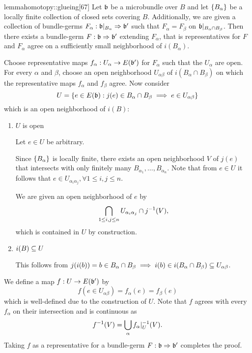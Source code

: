 
\begin{mystatement}{lemma}{homotopy::glueing}[67]
    Let $\bb$ be a microbundle over $B$ and let $\{B_\alpha\}$
    be a locally finite collection of closed sets covering $B$.
    Additionally, we are given a collection
    of bundle-germs $\germdef{F_\alpha}{\bb[B_\alpha]}{\bb'}$
    such that $F_\alpha = F_\beta$ on $\bb[B_\alpha \cap B_\beta]$.
    Then there exists a bundle-germ $\germdef{F}{\bb}{\bb'}$ extending $F_\alpha$,
    that is representatives for $F$ and $F_\alpha$ agree on a sufficiently small neighborhood of $i(B_\alpha)$.
\end{mystatement}

\begin{myproof}
    Choose representative maps $f_\alpha: U_\alpha \to E(\bb')$ for $F_\alpha$ such that the $U_\alpha$ are open.
    For every $\alpha$ and $\beta$, choose an open neighborhood $U_{\alpha\beta}$ of $i(B_\alpha \cap B_\beta)$ on which the representative maps $f_\alpha$ and $f_\beta$ agree.
    Now consider
    \[ U = \set{ e \in E(\bb)}{j(e) \in B_\alpha \cap B_\beta \implies e \in U_{\alpha\beta}} \]
    which is an open neighborhood of $i(B)$:
    \begin{enumerate}
        \item $U$ is open

        Let $e \in U$ be arbitrary.

        Since $\{B_\alpha\}$ is locally finite,
        there exists an open neighborhood $V$ of $j(e)$
        that intersects with only finitely many $B_{\alpha_1}, \dots, B_{\alpha_n}$.
        Note that from $e \in U$ it follows that $e \in U_{\alpha_i\alpha_j}, \forall 1 \le i, j \le n$.

        We are given an open neighborhood of $e$ by
        \[ \bigcap_{1 \le i, j \le n} U_{\alpha_i\alpha_j} \cap j^{-1}(V), \]
        which is contained in $U$ by construction.

        \item $i(B) \subseteq{} U$
        
        This follows from
        $j(i(b)) = b \in B_\alpha \cap B_\beta \implies i(b) \in i(B_\alpha \cap B_\beta) \subseteq{} U_{\alpha\beta}$.
    \end{enumerate}
    We define a map $f: U \to E(\bb')$ by
    \[ f(e \in U_{\alpha\beta}) = f_\alpha(e) = f_\beta(e) \]
    which is well-defined due to the construction of $U$.
    Note that $f$ agrees with every $f_\alpha$ on their intersection
    and is continuous as
    \[ f^{-1}(V) = \bigcup_{\alpha} f_\alpha\vert_{U}^{-1}(V). \]
    Taking $f$ as a representative for a bundle-germ $\germdef{F}{\bb}{\bb'}$
    completes the proof.
\end{myproof}